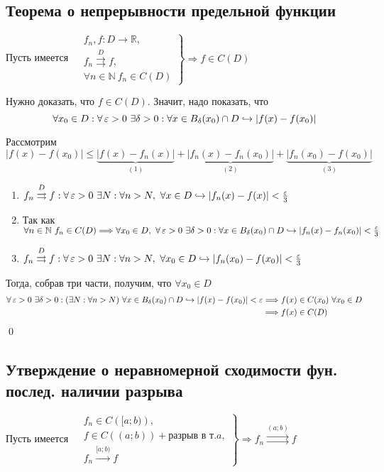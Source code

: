 \documentclass[a4paper]{article}
\begin{document}
\subsection{Теорема о непрерывности предельной функции}
\theorem Пусть имеется $\left.\begin{aligned}
    &f_n,f: D\longrightarrow\mathbb{R},\\
    &f_n\overset{D}{\rightrightarrows} f,\\
    &\forall n\in\mathbb{N}\ f_n\in C(D)
\end{aligned}\right\}\Longrightarrow f\in C(D)$

\proof Нужно доказать, что $f\in C(D)$. Значит, надо показать, что 
\begin{equation*}
    \forall x_0\in D: \forall\operatorname{\varepsilon}>0\ \exists\delta>0:\forall x\in B_{\delta}(x_0)\cap D\hookrightarrow|f(x)-f(x_0)|
\end{equation*}

Рассмотрим $|f(x)-f(x_0)|\leqslant\underbrace{|f(x)-f_n(x)|}_{(1)}+\underbrace{|f_n(x)-f_n(x_0)|}_{(2)}+\underbrace{|f_n(x_0)-f(x_0)|}_{(3)}$
\begin{enumerate}
    \item $f_n\overset{D}{\rightrightarrows} f:\forall\operatorname{\varepsilon}>0\ \exists N:\forall n>N,\ \forall x\in D\hookrightarrow|f_n(x)-f(x)|<\frac{\operatorname{\varepsilon}}{3}$
    \item Так как $\forall n\in\mathbb{N}\ f_n\in C(D)\Longrightarrow\forall x_0\in D,\ \forall\ve>0\ \exists\delta>0:\forall x\in B_{\delta}(x_0)\cap D\hookrightarrow|f_n(x)-f_n(x_0)|<\frac{\ve}{3}$
    \item $f_n\overset{D}{\rightrightarrows} f:\forall\operatorname{\varepsilon}>0\ \exists N:\forall n>N,\ \forall x_0\in D\hookrightarrow|f_n(x_0)-f(x_0)|<\frac{\operatorname{\varepsilon}}{3}$
\end{enumerate}

Тогда, собрав три части, получим, что $\forall x_0\in D$
\begin{equation*}
    \begin{aligned}
        \forall\ve>0\ \exists \delta>0:(\exists N:\forall n>N)\ \forall x\in B_{\delta}(x_0)\cap D\hookrightarrow|f(x)-f(x_0)|<\ve&\Longrightarrow f(x)\in C(x_0)\ \forall x_0\in D\\
        &\Longrightarrow f(x)\in C(D)
    \end{aligned}
\end{equation*}\qed


\subsection{Утверждение о неравномерной сходимости фун. послед. наличии разрыва}
\theorem Пусть имеется $\left.\begin{aligned}
    &f_n\in C\left([a;b)\right),\\
    &f\in C((a;b))+\text{разрыв в т.}a,\\
    &f_n\overset{[a;b)}{\longrightarrow} f
\end{aligned}\right\}\Longrightarrow f_n\overset{(a;b)}{\rightrightarrows} f$
\end{document}
